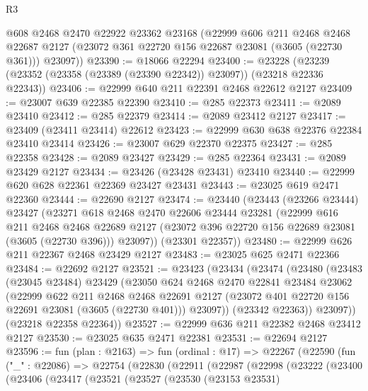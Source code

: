 \begin{lexlean}{R3}
\begin{coremodule}
      @608
      @2468
      @2470
      @22922
      @23362
      @23168
      (@22999
        @606
        @211
        @2468
        @2468
        @22687
        @2127
        (@23072 @361 @22720 @156 @22687 @23081 (@3605 (@22730 @361)))
        @23097))
@23390 := @18066 @22294
@23400 := @23228 (@23239 (@23352 (@23358 (@23389 (@23390 @22342)) @23097)) (@23218 @22336 @22343))
@23406 := @22999 @640 @211 @22391 @2468 @22612 @2127
@23409 := @23007 @639 @22385 @22390
@23410 := @285 @22373
@23411 := @2089 @23410
@23412 := @285 @22379
@23414 := @2089 @23412 @2127
@23417 := @23409 (@23411 @23414) @22612
@23423 := @22999 @630 @638 @22376 @22384 @23410 @23414
@23426 := @23007 @629 @22370 @22375
@23427 := @285 @22358
@23428 := @2089 @23427
@23429 := @285 @22364
@23431 := @2089 @23429 @2127
@23434 := @23426 (@23428 @23431) @23410
@23440 := @22999 @620 @628 @22361 @22369 @23427 @23431
@23443 := @23025 @619 @2471 @22360
@23444 := @22690 @2127
@23474 := @23440
    (@23443
      (@23266 @23444)
      @23427
      (@23271
        @618
        @2468
        @2470
        @22606
        @23444
        @23281
        (@22999
          @616
          @211
          @2468
          @2468
          @22689
          @2127
          (@23072 @396 @22720 @156 @22689 @23081 (@3605 (@22730 @396)))
          @23097))
      (@23301 @22357))
@23480 := @22999 @626 @211 @22367 @2468 @23429 @2127
@23483 := @23025 @625 @2471 @22366
@23484 := @22692 @2127
@23521 := @23423
    (@23434
      (@23474
        (@23480
          (@23483
            (@23045 @23484)
            @23429
            (@23050
              @624
              @2468
              @2470
              @22841
              @23484
              @23062
              (@22999
                @622
                @211
                @2468
                @2468
                @22691
                @2127
                (@23072 @401 @22720 @156 @22691 @23081 (@3605 (@22730 @401)))
                @23097))
            (@23342 @22363))
          @23097))
      (@23218 @22358 @22364))
@23527 := @22999 @636 @211 @22382 @2468 @23412 @2127
@23530 := @23025 @635 @2471 @22381
@23531 := @22694 @2127
@23596 := fun (plan : @2163) =>
  fun (ordinal : @17) =>
  @22267
    (@22590
      (fun ("_" : @22086) =>
      @22754
        (@22830
          (@22911
            (@22987
              (@22998
                (@23222
                  (@23400
                    (@23406
                      (@23417
                        (@23521
                          (@23527
                            (@23530
                              (@23153 @23531)

\end{coremodule}
\end{lexlean}
